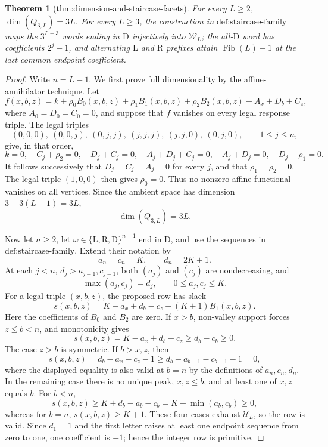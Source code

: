 \documentclass{article}
\newtheorem{theorem}{Theorem}
\begin{document}
\begin{theorem}[thm:dimension-and-staircase-facets]\label{thm:dimension-and-staircase-facets}
For every \(L\ge2\), \(\dim(Q_{3,L})=3L\). For every \(L\ge3\), the construction in \(\text{def:staircase-family}\) maps the \(3^{L-3}\) words ending in \(\mathrm D\) injectively into \(\mathcal W_L\); the all-\(\mathrm D\) word has coefficients \(2^j-1\), and alternating \(\mathrm L\) and \(\mathrm R\) prefixes attain \(\operatorname{Fib}(L)-1\) at the last common endpoint coefficient.
\end{theorem}
\begin{proof}
Write \(n=L-1\).  We first prove full dimensionality by the affine-annihilator technique.  Let
\[
 f(x,b,z)=k+\rho_0B_0(x,b,z)+\rho_1B_1(x,b,z)+\rho_2B_2(x,b,z)
             +A_x+D_b+C_z,
\]
where \(A_0=D_0=C_0=0\), and suppose that \(f\) vanishes on every legal response triple.  The legal triples
\[
 (0,0,0),\ (0,0,j),\ (0,j,j),\ (j,j,j),\ (j,j,0),\ (0,j,0),
 \qquad 1\le j\le n,
\]
give, in that order,
\[
 k=0,\quad C_j+\rho_2=0,\quad D_j+C_j=0,\quad
 A_j+D_j+C_j=0,\quad A_j+D_j=0,\quad D_j+\rho_1=0.
\]
It follows successively that \(D_j=C_j=A_j=0\) for every \(j\), and that \(\rho_1=\rho_2=0\).  The legal triple \((1,0,0)\) then gives \(\rho_0=0\).  Thus no nonzero affine functional vanishes on all vertices.  Since the ambient space has dimension \(3+3(L-1)=3L\),
\[
 \dim(Q_{3,L})=3L.
\]

Now let \(n\ge2\), let \(\omega\in\{\mathrm L,\mathrm R,\mathrm D\}^{n-1}\) end in \(\mathrm D\), and use the sequences in \(\text{def:staircase-family}\).  Extend their notation by
\[
 a_n=c_n=K,\qquad d_n=2K+1.
\]
At each \(j<n\), \(d_j>a_{j-1},c_{j-1}\), both \((a_j)\) and \((c_j)\) are nondecreasing, and
\[
 \max(a_j,c_j)=d_j,\qquad 0\le a_j,c_j\le K.
\]
For a legal triple \((x,b,z)\), the proposed row has slack
\[
 s(x,b,z)=K-a_x+d_b-c_z-(K+1)B_1(x,b,z).
\]
Here the coefficients of \(B_0\) and \(B_2\) are zero.  If \(x>b\), non-valley support forces \(z\le b<n\), and monotonicity gives
\[
 s(x,b,z)=K-a_x+d_b-c_z\ge d_b-c_b\ge0.
\]
The case \(z>b\) is symmetric.  If \(b>x,z\), then
\[
 s(x,b,z)=d_b-a_x-c_z-1
 \ge d_b-a_{b-1}-c_{b-1}-1=0,
\]
where the displayed equality is also valid at \(b=n\) by the definitions of \(a_n,c_n,d_n\).  In the remaining case there is no unique peak, \(x,z\le b\), and at least one of \(x,z\) equals \(b\).  For \(b<n\),
\[
 s(x,b,z)\ge K+d_b-a_b-c_b=K-\min(a_b,c_b)\ge0,
\]
whereas for \(b=n\), \(s(x,b,z)\ge K+1\).  These four cases exhaust \(\mathcal U_L\), so the row is valid.  Since \(d_1=1\) and the first letter raises at least one endpoint sequence from zero to one, one coefficient is \(-1\); hence the integer row is primitive.


\end{proof}
\end{document}
